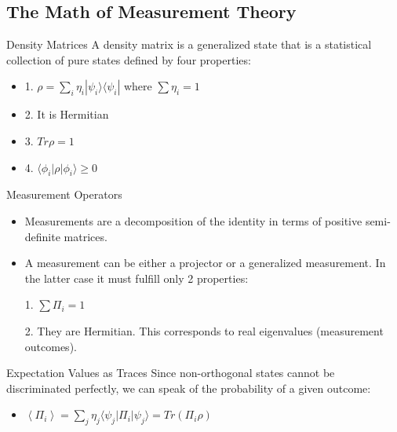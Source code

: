 \documentclass{beamer}
\newcommand{\av}[1]{\left\langle #1 \right\rangle}
\newcommand{\br}[1]{\langle #1|}
\newcommand{\ke}[1]{|#1\rangle}
\newcommand{\kb}[2]{\ke{#1}\br{#2}}
\begin{document}
\subsection{The Math of Measurement Theory}

\begin{frame}{Density Matrices}
A density matrix is a generalized state that is a statistical collection of pure states defined by four properties:
  \begin{itemize}


\item   
1. $\rho  = \sum_i \eta_i \kb{\psi_ i}{\psi_i}$ where $\sum \eta_i = 1$
\pause
\item

2. It is Hermitian 
\pause
\item

3.  $Tr \rho = 1$
\pause
\item
4. $\br {\phi_i} \rho \ke {\phi_i} \geq 0$
\end{itemize}
\end{frame}
\begin{frame}{Measurement Operators}
\begin{itemize}
\item
Measurements are a decomposition of the identity in terms of positive semi-definite matrices.
\pause
 \item
    A measurement can be either a projector or a generalized measurement.  In the latter case it must fulfill only 2 properties:
\pause

           1.  $\sum \Pi_i = 1$
\pause

	2. They are Hermitian.  This corresponds to real eigenvalues (measurement outcomes).


	
  \end{itemize}
\end{frame}

\begin{frame}{Expectation Values as Traces}
Since non-orthogonal states cannot be discriminated perfectly, we can speak of the probability of a given outcome:

\begin{itemize}

\item
	$\av {\Pi_i} = \sum_j \eta_j \br {\psi_j} \Pi_i \ke {\psi_j} = Tr(\Pi_i \rho)$

\end{itemize}
\end{frame}
\end{document}
